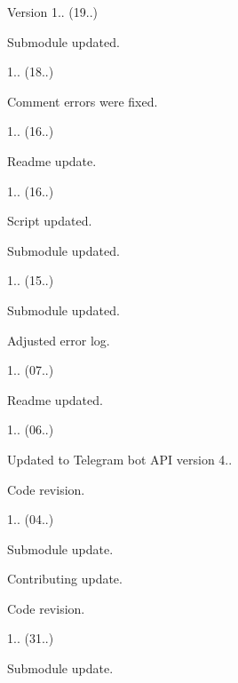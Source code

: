 \begin{DoxyVersion}{Version}
1.. (19..)
\begin{DoxyItemize}
\item Submodule updated. 
\end{DoxyItemize}

1.. (18..)
\begin{DoxyItemize}
\item Comment errors were fixed. 
\end{DoxyItemize}

1.. (16..)
\begin{DoxyItemize}
\item Readme update. 
\end{DoxyItemize}

1.. (16..)
\begin{DoxyItemize}
\item Script updated.
\item Submodule updated. 
\end{DoxyItemize}

1.. (15..)
\begin{DoxyItemize}
\item Submodule updated.
\item Adjusted error log. 
\end{DoxyItemize}

1.. (07..)
\begin{DoxyItemize}
\item Readme updated. 
\end{DoxyItemize}

1.. (06..)
\begin{DoxyItemize}
\item Updated to Telegram bot A\+PI version 4..
\item Code revision. 
\end{DoxyItemize}

1.. (04..)
\begin{DoxyItemize}
\item Submodule update.
\item Contributing update.
\item Code revision. 
\end{DoxyItemize}

1.. (31..)
\begin{DoxyItemize}
\item Submodule update. 
\end{DoxyItemize}


\end{DoxyVersion}
